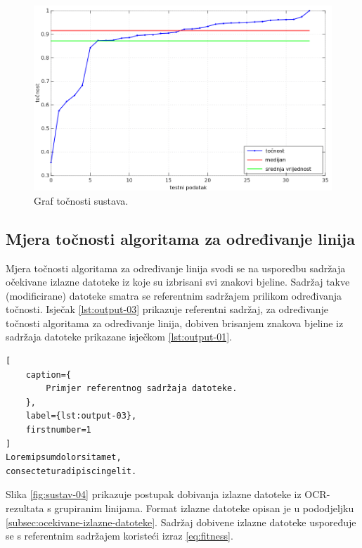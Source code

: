 \documentclass[times, utf8, zavrsni]{fer}
\begin{document}
\begin{figure}[htb]
    \centering
    \captionsetup{justification=centering,margin=2cm}
    \includegraphics[width=\textwidth]{images/result-example-01.png}
    \caption{Graf točnosti sustava.}
    \label{fig:result-example-01}
\end{figure}

\pagebreak




\subsection{Mjera točnosti algoritama za određivanje linija}
Mjera točnosti algoritama za određivanje linija svodi se na usporedbu
sadržaja očekivane izlazne datoteke iz koje su izbrisani svi znakovi bjeline.
Sadržaj takve (modificirane) datoteke smatra se referentnim sadržajem prilikom
određivanja točnosti. Isječak \ref{lst:output-03} prikazuje referentni sadržaj,
za određivanje točnosti algoritama za određivanje linija, dobiven brisanjem
znakova bjeline iz sadržaja datoteke prikazane isječkom \ref{lst:output-01}.

\begin{lstlisting}[
    caption={
        Primjer referentnog sadržaja datoteke.
    },
    label={lst:output-03},
    firstnumber=1
]
Loremipsumdolorsitamet,
consecteturadipiscingelit.
\end{lstlisting}

Slika \ref{fig:sustav-04} prikazuje postupak dobivanja izlazne datoteke iz
OCR-rezultata s grupiranim linijama. Format izlazne datoteke opisan je u
pododjeljku \ref{subsec:ocekivane-izlazne-datoteke}. Sadržaj dobivene izlazne
datoteke uspoređuje se s referentnim sadržajem koristeći izraz
\ref{eq:fitness}.
\end{document}

